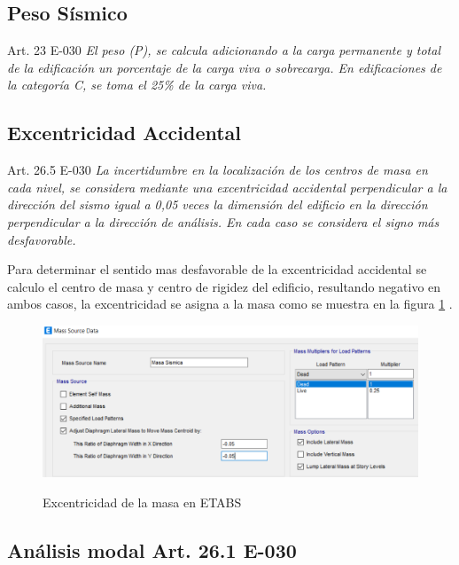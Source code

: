 \documentclass[12pt]{article}
\begin{document}
\subsection{Peso Sísmico}
\begin{mybox3}{Art. 23 E-030}
\textit{El peso (P), se calcula adicionando a la carga permanente y total de la edificación un porcentaje de la carga viva o sobrecarga. En edificaciones de la categoría C, se toma el 25\% de la carga viva.}
\end{mybox3}

\subsection{Excentricidad Accidental}

\begin{mybox3}{Art. 26.5 E-030}
\textit{La incertidumbre en la localización de los centros de masa en cada nivel, se considera mediante una excentricidad accidental perpendicular a la dirección del sismo igual a 0,05 veces la dimensión del edificio en la dirección perpendicular a la dirección de análisis. En cada caso se considera el signo más desfavorable.}
\end{mybox3}
\noindent
Para determinar el sentido mas desfavorable de la excentricidad accidental se calculo el centro de masa y centro de rigidez del edificio, resultando negativo en ambos casos, la excentricidad se asigna a la masa como se muestra en la figura \ref{masa} .

\begin{figure}[h!]
    \centering
    \caption{Excentricidad de la masa en ETABS}
    \includegraphics[scale=0.7]{IMAGENES/15.PNG}
    \label{masa}
\end{figure}

\newpage
\subsection{Análisis modal Art. 26.1 E-030}
\end{document}
